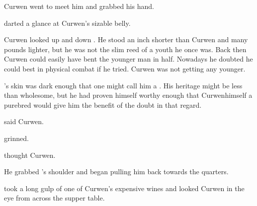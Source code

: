 Curwen went to meet him and grabbed his hand.

\Shachar darted a glance at Curwen's sizable belly. 

Curwen looked up and down \Shachar. 
He stood an inch shorter than Curwen and many pounds lighter, but he was not the slim reed of a youth he once was. 
Back then Curwen could easily have bent the younger man in half. 
Nowadays he doubted he could best \Shachar in physical combat if he tried. 
Curwen was not getting any younger. 

\Shachar's skin was dark enough that one might call him a \demihuman. 
His heritage might be less than wholesome, but he had proven himself worthy enough that Curwen\dash himself a purebred \trueman\dash would give him the benefit of the doubt in that regard.


 said Curwen. 

\Shachar grinned.



\tho{\Qliphoth!} thought Curwen.

He grabbed \Shachar's shoulder and began pulling him back towards the \ishrah quarters.





\begin{comment}
  \subsection{Carzain tells Curwen news}
\end{comment}
\Shachar took a long gulp of one of Curwen's expensive wines and looked Curwen in the eye from across the supper table.

